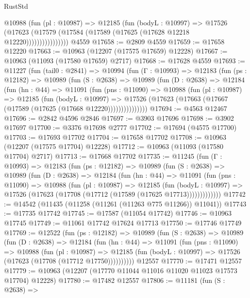 \begin{lexlean}{RustStd}
\begin{coremodule}
                  @10988
                    (fun (pl : @10987) =>
                    @12185
                      (fun (bodyL : @10997) =>
                      @17526
                        (@17623
                          (@17579 (@17584 (@17589 (@17625 (@17628 @12218 @12220))))))))))))))))
    @4559
@17658 := @2809 @4559
@17659 := @17658 @12220
@17663 := @10963 (@12207 (@17575 @17659) @12228)
@17667 := @10963 (@11093 (@17580 @17659) @2717)
@17668 := @17628 @4559
@17693 := @11227
    (fun (tail0 : @2841) =>
    @10994
      (fun (Γ : @10993) =>
      @12183
        (fun (ps : @12182) =>
        @10989
          (fun (S : @2638) =>
          @10989
            (fun (D : @2638) =>
            @12184
              (fun (hn : @44) =>
              @11091
                (fun (pns : @11090) =>
                @10988
                  (fun (pl : @10987) =>
                  @12185
                    (fun (bodyL : @10997) =>
                    @17526 (@17623 (@17663 (@17667 (@17589 (@17625 (@17668 @12220)))))))))))))))
@17694 := @4563 @12467
@17696 := @2842 @4596 @2846
@17697 := @3903 @17696
@17698 := @3902 @17697
@17700 := @3376 @17698 @2777
@17702 := @17694 (@4575 @17700)
@17703 := @17693 @17702
@17704 := @17658 @17702
@17708 := @10963 (@12207 (@17575 @17704) @12228)
@17712 := @10963 (@11093 (@17580 @17704) @2717)
@17713 := @17668 @17702
@17735 := @11245
    (fun (Γ : @10993) =>
    @12183
      (fun (ps : @12182) =>
      @10989
        (fun (S : @2638) =>
        @10989
          (fun (D : @2638) =>
          @12184
            (fun (hn : @44) =>
            @11091
              (fun (pns : @11090) =>
              @10988
                (fun (pl : @10987) =>
                @12185
                  (fun (bodyL : @10997) =>
                  @17526 (@17623 (@17708 (@17712 (@17589 (@17625 @17713)))))))))))))
@17742 := @14542 (@11435 (@11258 (@11261 (@11263 @775 @11266)) @11041))
@17743 := @17735 @17742
@17745 := @17587 (@11054 @17742)
@17746 := @10963 @17745
@17749 := @11061 @17742 @17624 @17713
@17750 := @17746 @17749
@17769 := @12522
    (fun (ps : @12182) =>
    @10989
      (fun (S : @2638) =>
      @10989
        (fun (D : @2638) =>
        @12184
          (fun (hn : @44) =>
          @11091
            (fun (pns : @11090) =>
            @10988
              (fun (pl : @10987) =>
              @12185 (fun (bodyL : @10997) => @17526 (@17623 (@17708 (@17712 @17750))))))))))
    @12557
@17770 := @17471 @12557
@17779 := @10963 (@12207 (@17770 @11044 @11016 @11020 @11023 @17573 @17704) @12228)
@17780 := @17482 @12557
@17806 := @11181
    (fun (S : @2638) =>

\end{coremodule}
\end{lexlean}
